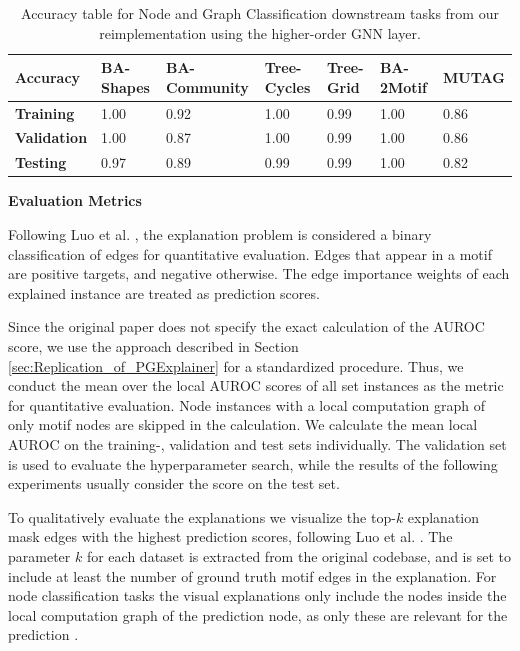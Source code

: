 \begin{table}[h]
    \centering
    \scriptsize
    \begin{tabularx}{\linewidth}{l|X X X X|X X}
    \hline
    \textbf{Accuracy} & \textbf{BA-Shapes} & \textbf{BA-Community} & \textbf{Tree-Cycles} & \textbf{Tree-Grid} & \textbf{BA-2Motif} & \textbf{MUTAG} \\
    \hline
    \textbf{Training}   & 1.00 & 0.92 & 1.00 & 0.99 & 1.00 & 0.86 \\
    \textbf{Validation} & 1.00 & 0.87 & 1.00 & 0.99 & 1.00 & 0.86 \\
    \textbf{Testing}    & 0.97 & 0.89 & 0.99 & 0.99 & 1.00 & 0.82 \\
    \hline
    \end{tabularx}
    \caption[Accuracies of higher-order GNN downstream task]{Accuracy table for Node and Graph Classification downstream tasks from our reimplementation using the higher-order GNN layer.}
    \label{tab:our-dt-accuracy}
\end{table}

\textbf{Evaluation Metrics}\par
Following Luo et al. \cite{luo2020parameterized}, the explanation problem is considered a binary classification of edges for quantitative evaluation. Edges that appear in a motif are positive targets, and negative otherwise. The edge importance weights of each explained instance are treated as prediction scores.

Since the original paper does not specify the exact calculation of the AUROC score, we use the approach described in Section \ref{sec:Replication_of_PGExplainer} for a standardized procedure. Thus, we conduct the mean over the local AUROC scores of all set instances as the metric for quantitative evaluation. Node instances with a local computation graph of only motif nodes are skipped in the calculation. We calculate the mean local AUROC on the training-, validation and test sets individually. The validation set is used to evaluate the hyperparameter search, while the results of the following experiments usually consider the score on the test set.

To qualitatively evaluate the explanations we visualize the top-$k$ explanation mask edges with the highest prediction scores, following Luo et al. \cite{luo2020parameterized}. The parameter $k$ for each dataset is extracted from the original codebase, and is set to include at least the number of ground truth motif edges in the explanation. For node classification tasks the visual explanations only include the nodes inside the local computation graph of the prediction node, as only these are relevant for the prediction \cite{ying2019gnnexplainer}.


